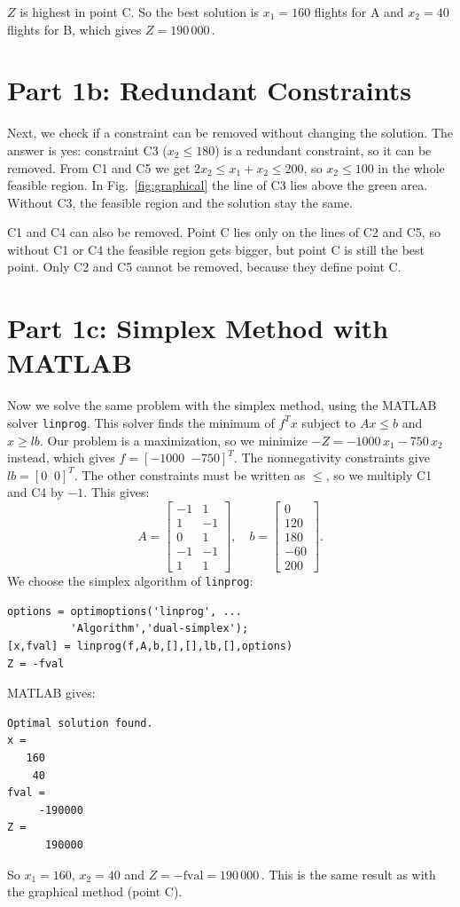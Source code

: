 \documentclass{ieeeaccess}
\begin{document}
$Z$ is highest in point C. So the best solution is $x_1 = 160$ flights for
A and $x_2 = 40$ flights for B, which gives $Z = 190\,000$\,\texteuro.

\section{Part 1b: Redundant Constraints}
Next, we check if a constraint can be removed without changing the solution.
The answer is yes: constraint C3 ($x_2 \le 180$) is a redundant constraint,
so it can be removed. From C1 and C5 we get $2x_2 \le x_1 + x_2 \le 200$, so
$x_2 \le 100$ in the whole feasible region. In Fig.~\ref{fig:graphical} the
line of C3 lies above the green area. Without C3, the feasible region and
the solution stay the same.

C1 and C4 can also be removed. Point C lies only on the lines of C2 and C5,
so without C1 or C4 the feasible region gets bigger, but point C is still the
best point. Only C2 and C5 cannot be removed, because they define point C.

\section{Part 1c: Simplex Method with MATLAB}
Now we solve the same problem with the simplex method, using the MATLAB
solver \texttt{linprog}. This solver finds the minimum of $f^T x$ subject to
$A x \le b$ and $x \ge lb$. Our problem is a maximization, so we minimize
$-Z = -1000\,x_1 - 750\,x_2$ instead, which gives $f = [-1000 \;\; {-750}]^T$.
The nonnegativity constraints give $lb = [0 \;\; 0]^T$. The other constraints
must be written as $\le$, so we multiply C1 and C4 by $-1$. This gives:
\[
  A = \begin{bmatrix} -1 & 1 \\ 1 & -1 \\ 0 & 1 \\ -1 & -1 \\ 1 & 1 \end{bmatrix},\quad
  b = \begin{bmatrix} 0 \\ 120 \\ 180 \\ -60 \\ 200 \end{bmatrix}.
\]
We choose the simplex algorithm of \texttt{linprog}:
\begin{verbatim}
options = optimoptions('linprog', ...
          'Algorithm','dual-simplex');
[x,fval] = linprog(f,A,b,[],[],lb,[],options)
Z = -fval
\end{verbatim}
MATLAB gives:
\begin{verbatim}
Optimal solution found.
x =
   160
    40
fval =
     -190000
Z =
      190000
\end{verbatim}
So $x_1 = 160$, $x_2 = 40$ and $Z = -\text{fval} = 190\,000$\,\texteuro.
This is the same result as with the graphical method (point C).
\end{document}
